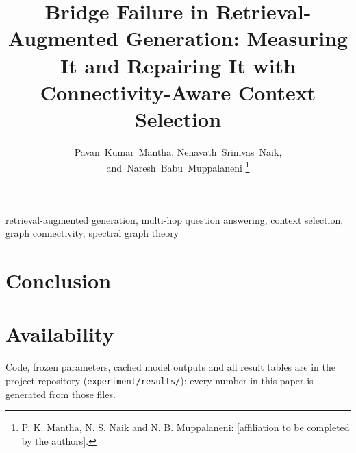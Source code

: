 \documentclass[journal]{IEEEtran}
\begin{document}
\title{Bridge Failure in Retrieval-Augmented Generation: Measuring It and Repairing It with Connectivity-Aware Context Selection}

\author{Pavan~Kumar~Mantha,
        Nenavath~Srinivas~Naik,
        and~Naresh~Babu~Muppalaneni%
\thanks{P. K. Mantha, N. S. Naik and N. B. Muppalaneni: [affiliation to be completed by the authors].}}

\maketitle

\begin{abstract}

\end{abstract}

\begin{IEEEkeywords}
retrieval-augmented generation, multi-hop question answering, context selection, graph connectivity, spectral graph theory
\end{IEEEkeywords}








\section{Conclusion}
\label{sec:conclusion}


\section*{Availability}
Code, frozen parameters, cached model outputs and all result tables are in the project repository (\texttt{experiment/results/}); every number in this paper is generated from those files.



\end{document}
